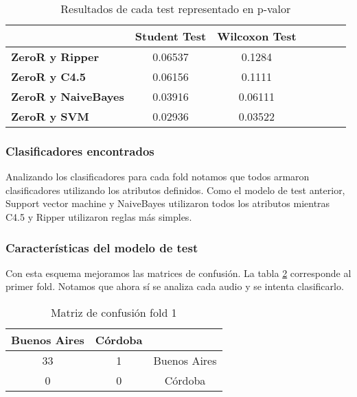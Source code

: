 \begin{table}[H]
	\centering
	\begin{tabular}{|l|c|c|c|c|c|c|}
		\hline
		\textbf{}  & \textbf{Student Test} & \textbf{Wilcoxon Test} \\ \hline
		\textbf{ZeroR y Ripper}  & 0.06537 & 0.1284 \\ \hline
		\textbf{ZeroR y C4.5}  & 0.06156 &  0.1111 \\ \hline
		\textbf{ZeroR y NaiveBayes}  & 0.03916 & 0.06111 \\ \hline
		\textbf{ZeroR y SVM}  &  0.02936 & 0.03522 \\ \hline
	\end{tabular}
	\caption{Resultados de cada test representado en p-valor}
	\label{res_tests_wilcoxon_student}
\end{table}

\subsubsection{Clasificadores encontrados}

Analizando los clasificadores para cada fold notamos que todos armaron clasificadores utilizando los atributos definidos. Como el modelo de test anterior, Support vector machine y NaiveBayes utilizaron todos los atributos mientras C4.5 y Ripper utilizaron reglas más simples.

\subsubsection{Características del modelo de test}

Con esta esquema mejoramos las matrices de confusión. La tabla \ref{mat_conf_f1} corresponde al primer fold. Notamos que ahora sí se analiza cada audio y se intenta clasificarlo. 

\begin{table}[H]
	\centering
	\begin{tabular}{|c|c|c|}
		\hline
		Buenos Aires & Córdoba & \\ \hline
		33 & 1 & Buenos Aires\\ \hline
		0 & 0 & Córdoba\\ \hline
	\end{tabular}
	\caption{Matriz de confusión fold 1}
	\label{mat_conf_f1}
\end{table}

